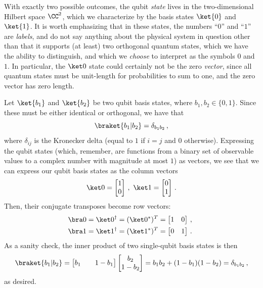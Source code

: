       With exactly two possible outcomes, the qubit \emph{state} lives
        in the two-dimensional Hilbert space $\CC^2$, which we characterize by
        the basis states $\ket{0}$ and $\ket{1}$. 
        It is worth emphasizing that in these states, the numbers ``$0$'' and ``$1$'' 
        are \emph{labels}, and do not say anything about the physical
        system in question other than that it supports (at least) two orthogonal
        quantum states, which we have the
        ability to distinguish, and which we \emph{choose} to interpret as the
        symbols $0$ and $1$.
        In particular, the $\ket 0$ state could certainly not be the zero
        \emph{vector}, since all quantum states must be unit-length for
        probabilities to sum to one, and the zero vector has zero length. 

      Let $\ket{b_1}$ and $\ket{b_2}$ be two qubit basis states, where $b_1, b_2 \in
        \{0,1\}$. Since these must be either identical or orthogonal, we have that
      \[
        \braket{b_1|b_2} = \delta_{b_1 b_2}\, ,
      \]
      where $\delta_{ij}$ is the Kronecker delta (equal to $1$ if $i = j$ and $0$
        otherwise).
        Expressing the qubit states (which, remember, are functions from a binary
        set of observable values to a complex number with magnitude at most
        $1$) as vectors, we see that we can express our qubit basis states as
        the column vectors
        \[
          \ket0 = \begin{bmatrix} 1 \\ 0 \end{bmatrix}\, ,\ 
          \ket1 = \begin{bmatrix} 0 \\ 1 \end{bmatrix}\, .
        \]
        Then, their conjugate transposes become row vectors:
        \begin{align*}
          \bra0 &= \ket0^{\dagger} = (\ket0^*)^T = \begin{bmatrix} 1 & 0 \end{bmatrix}\, ,\ \\
          \bra1 &= \ket1^{\dagger} = (\ket1^*)^T = \begin{bmatrix} 0 & 1 \end{bmatrix}\, .
        \end{align*}
        As a sanity check, the inner product of two single-qubit basis states is
        then
        \[
          \braket{b_1|b_2} = \begin{bmatrix} b_1 && 1-b_1 \end{bmatrix}
            \begin{bmatrix} b_2 \\ 1-b_2 \end{bmatrix}
              = b_1 b_2 + (1-b_1)(1-b_2) 
              = \delta_{b_1 b_2}\, ,
        \]
        as desired.

